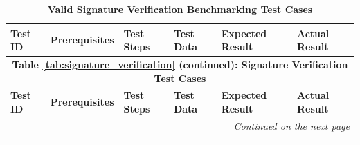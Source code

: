 \documentclass[]{final_report}
\theoremstyle{definition}
\begin{document}
\begin{longtable}{|l|p{2.5cm}|p{2.8cm}|p{3cm}|p{2cm}|p{1.5cm}|}
  \caption{\textbf{Valid Signature Verification Benchmarking Test Cases}} \\
  \hline
  \textbf{Test ID} & \textbf{Prerequisites} & \textbf{Test Steps} & \textbf{Test Data} & \textbf{Expected Result} & \textbf{Actual Result} \\
  \hline
  \endfirsthead

  \multicolumn{6}{c}{\textbf{Table \ref{tab:signature_verification} (continued): Signature Verification Test Cases}} \\
  \hline
  \textbf{Test ID} & \textbf{Prerequisites} & \textbf{Test Steps} & \textbf{Test Data} & \textbf{Expected Result} & \textbf{Actual Result} \\
  \hline
  \endhead

  \hline
  \multicolumn{6}{r}{\textit{Continued on the next page}} \\
  \endfoot


\end{longtable}
\end{document}
